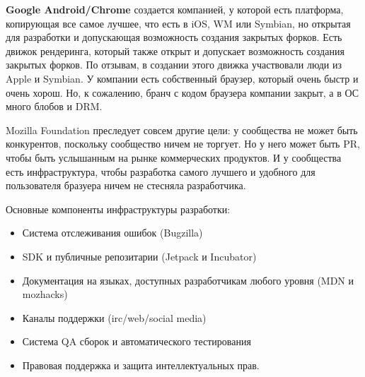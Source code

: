 \documentclass[10pt, a5paper]{article}
\begin{document}
{\bf Google Android/Chrome} создается компанией, у которой есть платформа, 
копирующая все самое лучшее, что есть в iOS, WM или Symbian, но открытая для разработки и допускающая
возможность создания закрытых форков. Есть движок рендеринга, который также
открыт и допускает возможность создания закрытых форков. По отзывам, в создании этого 
движка участвовали люди из Apple и Symbian. У компании есть собственный браузер, который
очень быстр и очень хорош. Но, к сожалению, бранч с кодом браузера компании закрыт, 
а в ОС много блобов и DRM.

Mozilla Foundation преследует совсем другие цели: у сообщества не может быть
конкурентов, поскольку сообщество ничем не торгует. Но у него может быть PR,
чтобы быть услышанным на рынке коммерческих продуктов. И у сообщества есть
инфраструктура, чтобы разработка самого лучшего и удобного для пользователя
бразуера ничем не стесняла разработчика.

Основные компоненты инфраструктуры разработки:
\begin{itemize}
	\item Система отслеживания ошибок (Bugzilla)
	\item SDK и публичные репозитарии (Jetpack и Incubator)
	\item Документация на языках, доступных разработчикам любого уровня (MDN и mozhacks)
	\item Каналы поддержки (irc/web/social media)
	\item Система QA сборок и автоматического тестирования
	\item Правовая поддержка и защита интеллектуальных прав.
\end{itemize}
\end{document}
